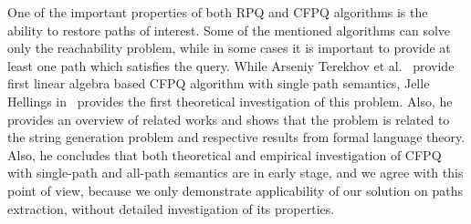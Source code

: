 One of the important properties of both RPQ and CFPQ algorithms is the ability to restore paths of interest. 
Some of the mentioned algorithms can solve only the reachability problem, while in some cases it is important to provide at least one path which satisfies the query. 
While Arseniy Terekhov et al.~\cite{10.1145/3398682.3399163} provide first linear algebra based CFPQ algorithm with single path semantics, Jelle Hellings in~\cite{!!!} provides the first theoretical investigation of this problem. Also, he provides an overview of related works and shows that the problem is related to the string generation problem and respective results from formal language theory.
Also, he concludes that both theoretical and empirical investigation of CFPQ with single-path and all-path semantics are in early stage, and we agree with this point of view, because we only demonstrate applicability of our solution on paths extraction, without detailed investigation of its properties.


